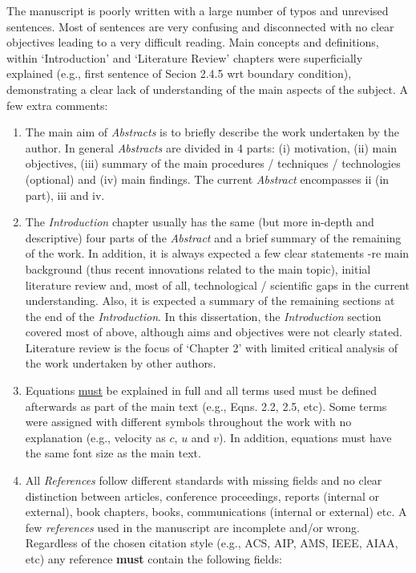 \documentclass[14pt,twoside]{report}
\begin{document}
The manuscript is poorly written with a large number of typos and unrevised sentences. Most of sentences are very confusing and disconnected with no clear objectives leading to a very difficult reading. Main concepts and definitions, within `Introduction' and `Literature Review' chapters were superficially explained (e.g., first sentence of Secion 2.4.5 wrt boundary condition), demonstrating a clear lack of understanding of the main aspects of the subject. A few extra comments:
\begin{enumerate}
\item The main aim of {\it Abstracts} is to briefly describe the work undertaken by the author. In general {\it Abstracts} are divided in 4 parts: (i) motivation, (ii) main objectives, (iii) summary of the main procedures / techniques / technologies (optional) and (iv) main findings. The current {\it Abstract} encompasses ii (in part), iii and iv.
%
\item The {\it Introduction} chapter usually has the same (but more in-depth and descriptive) four parts of the {\it Abstract} and a brief summary of the remaining of the work. In addition, it is always expected a few clear statements -re main background (thus recent innovations related to the main topic), initial literature review and, most of all, technological / scientific gaps in the current understanding. Also, it is expected a summary of the remaining sections at the end of the {\it Introduction}. In this dissertation, the {\it Introduction} section covered most of above, although aims and objectives were not clearly stated. Literature review is the focus of `Chapter 2' with limited critical analysis of the work undertaken by other authors. 
%
\item Equations \underline{must} be explained in full and all terms used must be defined afterwards as part of the main text (e.g., Eqns. 2.2, 2.5, etc). Some terms were assigned with different symbols throughout the work with no explanation (e.g., velocity as $c$, $u$ and $v$). In addition, equations must have the same font size as the main text.
%
\item All {\it References} follow different standards with missing fields and no clear distinction between articles, conference proceedings, reports (internal or external), book chapters, books, communications (internal or external) etc.  A few {\it references} used in the manuscript are incomplete and/or wrong. Regardless of the chosen citation style (e.g., ACS, AIP, AMS, IEEE, AIAA, etc) any reference {\bf must} contain the following fields: 

\end{enumerate}
\end{document}
